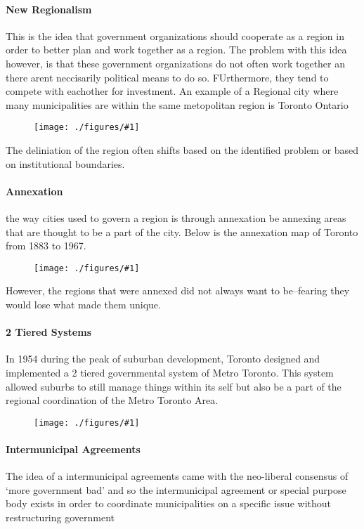 \documentclass[12pt]{book}
\newcommand{\incimg}[2]{%
       \begin{figure}[h]
               \centering
               \texttt{[image: ./figures/\#1]}
       \end{figure}
}
\begin{document}
\paragraph{New Regionalism}
This is the idea that government organizations should cooperate as a region in order
to better plan and work together as a region. The problem with this idea however, is 
that these government organizations do not often work together an there arent 
neccisarily political means to do so. FUrthermore, they tend to compete with eachother
for investment. An example of a Regional city where many municipalities are 
within the same metopolitan region is Toronto Ontario 
\incimg{toronto}{0.5}

The deliniation of the region often shifts based on the identified problem or based
on institutional boundaries.

\paragraph{Annexation}
the way cities used to govern a region is through annexation be annexing areas that
are thought to be a part of the city. Below is the annexation map of Toronto from
1883 to 1967.
\incimg{annex}{0.5}

However, the regions that were annexed did not always want to be--fearing they would
lose what made them unique.

\paragraph{2 Tiered Systems}
In 1954 during the peak of suburban development, Toronto designed and implemented a 
2 tiered governmental system of Metro Toronto. This system allowed suburbs to still
manage things within its self but also be a part of the regional coordination of 
the Metro Toronto Area.
\incimg{2tier}{0.2}

\paragraph{Intermunicipal Agreements}
The idea of a intermunicipal agreements came with the neo-liberal consensus of `more
government bad' and so the intermunicipal agreement or special purpose body exists
in order to coordinate municipalities on a specific issue 
without restructuring government
\end{document}

